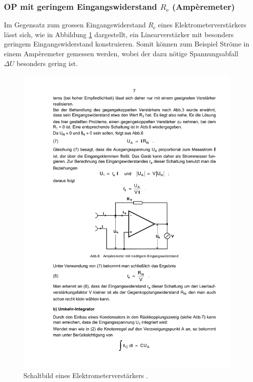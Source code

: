 \subsubsection{OP mit geringem Eingangswiderstand $R_\text{e}$ (Ampèremeter)}
\label{subsubsec:amperemeter}
Im Gegensatz zum grossen Eingangswiderstand $R_\text{e}$ eines 
Elektrometerverstärkers lässt sich, wie in Abbildung
\ref{fig:amperemeter} dargestellt, ein Linearverstärker mit 
besonders geringem Eingangswiderstand konstruieren.
Somit können zum Beispiel Ströme in einem Ampèremeter gemessen werden, wobei
der dazu nötige Spannungsabfall $\Delta U$ besonders gering ist.
\begin{figure}
    \centering
    \includegraphics[width=0.5\linewidth]{img/amperemeter.pdf}
    \caption{Schaltbild eines Elektrometerverstärkers \cite{V51}.}
    \label{fig:amperemeter}
\end{figure}

